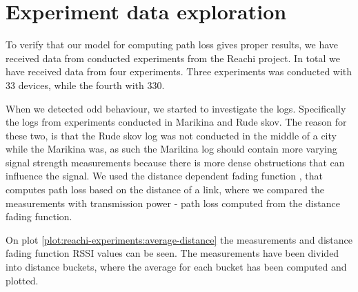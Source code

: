 \section{Experiment data exploration}
To verify that our model for computing path loss gives proper results, we have received data from conducted experiments from the Reachi project. In total we have received data from four experiments. Three experiments was conducted with 33 devices, while the fourth with 330.


When we detected odd behaviour, we started to investigate the logs. Specifically the logs from experiments conducted in Marikina and Rude skov. The reason for these two, is that the Rude skov log was not conducted in the middle of a city while the Marikina was, as such the Marikina log should contain more varying signal strength measurements because there is more dense obstructions that can influence the signal. We used the distance dependent fading function \cite{rasmus_paper}, that computes path loss based on the distance of a link, where we compared the measurements with transmission power - path loss computed from the distance fading function.


On plot \ref{plot:reachi-experiments:average-distance} the measurements and distance fading function RSSI values can be seen. The measurements have been divided into distance buckets, where the average for each bucket has been computed and plotted.


